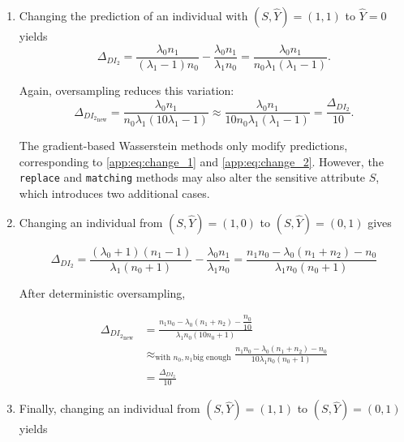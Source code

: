 \documentclass[runningheads, orivec]{llncs}
\begin{document}
\begin{enumerate}

\item Changing the prediction of an individual with $(S,\widehat{Y})=(1,1)$ to $\widehat{Y}=0$ yields
\begin{equation}
\label{app:eq:change_2}
\Delta_{DI_2}
=
\frac{\lambda_0 n_1}{(\lambda_1 - 1)n_0}
-
\frac{\lambda_0 n_1}{\lambda_1 n_0}
=
\frac{\lambda_0 n_1}{n_0 \lambda_1 (\lambda_1 - 1)}.
\end{equation}

Again, oversampling reduces this variation:
\begin{equation}
    \Delta_{{DI_2}_{\text{new}}}
=
\frac{\lambda_0 n_1}{n_0 \lambda_1 (10\lambda_1 - 1)}
\approx
\frac{\lambda_0 n_1}{10 n_0 \lambda_1 (\lambda_1 - 1)}
=
\frac{\Delta_{DI_2}}{10}.
\end{equation}

The gradient-based Wasserstein methods only modify predictions, corresponding to \eqref{app:eq:change_1} and \eqref{app:eq:change_2}. However, the \texttt{replace} and \texttt{matching} methods may also alter the sensitive attribute $S$, which introduces two additional cases.

\item Changing an individual from $(S,\widehat{Y})=(1,0)$ to $(S,\widehat{Y})=(0,1)$ gives

\begin{equation}
    \label{app:eq:change_3}
    \Delta_{DI_2} = \frac{(\lambda_0+1)(n_1-1)}{\lambda_1(n_0+1)} - \frac{\lambda_0   n_1}{\lambda_1 n_0} = \frac{n_1n_0 - \lambda_0(n_1 + n_2) - n_0}{\lambda_1n_0(n_0+1)}
    \end{equation}

After deterministic oversampling,

    \begin{equation}\begin{aligned}
        \Delta_{{DI_2}_{\text{new}}}  &= \frac{n_1n_0 - \lambda_0(n_1 + n_2) - \dfrac{n_0}{10}}{\lambda_1n_0(10n_0+1)} \\ 
    & \approx_{\text{with } n_0, n_1 \text{big enough}} \frac{n_1n_0 - \lambda_0(n_1 + n_2) - n_0}{10\lambda_1n_0(n_0+1)} \\
    & = \frac{\Delta_{DI_2}}{10}
    \end{aligned}
    \end{equation}

\item Finally, changing an individual from $(S,\widehat{Y})=(1,1)$ to $(S,\widehat{Y})=(0,1)$ yields


\end{enumerate}
\end{document}
